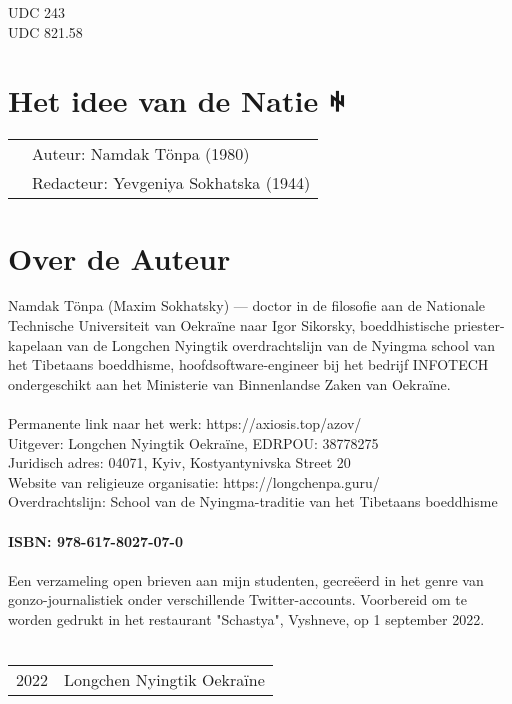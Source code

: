 UDC 243\\
UDC 821.58

\section*{Het idee van de Natie ꑭ}

\begin{tabular}{ll}
& Auteur: Namdak Tönpa (1980)\\
& Redacteur: Yevgeniya Sokhatska (1944)\\
\end{tabular}

\section*{Over de Auteur}
Namdak Tönpa (Maxim Sokhatsky) --- doctor in de
filosofie aan de Nationale Technische Universiteit
van Oekraïne naar Igor Sikorsky,
boeddhistische priester-kapelaan van de Longchen
Nyingtik overdrachtslijn van de Nyingma school
van het Tibetaans boeddhisme, hoofdsoftware-engineer
bij het bedrijf INFOTECH ondergeschikt aan
het Ministerie van Binnenlandse Zaken van Oekraïne.
\\
\\
Permanente link naar het werk: https://axiosis.top/azov/ \\
Uitgever: Longchen Nyingtik Oekraïne, EDRPOU: 38778275 \\
Juridisch adres: 04071, Kyiv, Kostyantynivska Street 20 \\
Website van religieuze organisatie: https://longchenpa.guru/ \\
Overdrachtslijn: School van de Nyingma-traditie van het Tibetaans boeddhisme \\
\\
{\bf ISBN: 978-617-8027-07-0 \hspace{2em}} \\
\\
\indent Een verzameling open brieven aan mijn studenten,
gecreëerd in het genre van gonzo-journalistiek onder
verschillende Twitter-accounts. Voorbereid om te worden
gedrukt in het restaurant "Schastya", Vyshneve, op 1 september 2022.
\\
\\
\begin{tabular}{ll}
\textcopyright{} 2022 & Longchen Nyingtik Oekraïne
\end{tabular}
